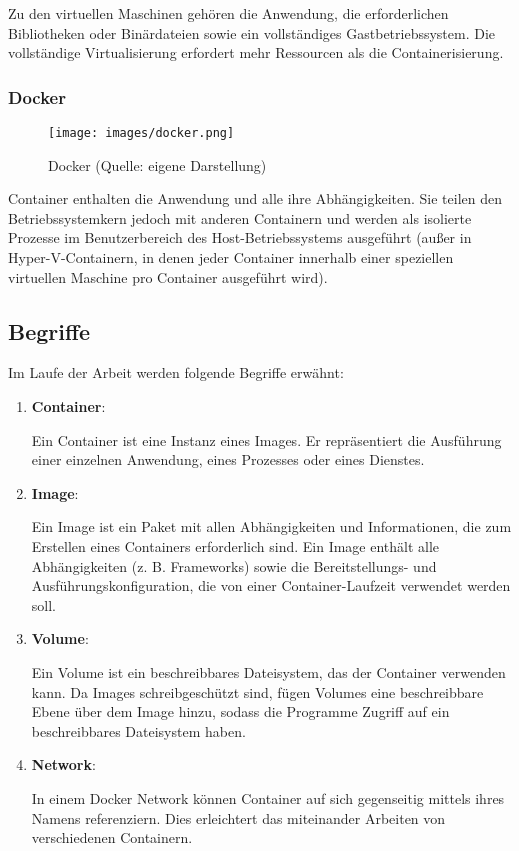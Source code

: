 Zu den virtuellen Maschinen gehören die Anwendung, die erforderlichen Bibliotheken oder Binärdateien sowie ein vollständiges Gastbetriebssystem. Die vollständige Virtualisierung erfordert mehr Ressourcen als die Containerisierung. \cite{docker}

\subsubsection{Docker}

\begin{figure}[H]
    \begin{center}
        \texttt{[image: images/docker.png]}
        \caption{Docker (Quelle: eigene Darstellung)}
    \end{center}
\end{figure}

Container enthalten die Anwendung und alle ihre Abhängigkeiten. Sie teilen den Betriebssystemkern jedoch mit anderen Containern und werden als isolierte Prozesse im Benutzerbereich des Host-Betriebssystems ausgeführt (außer in Hyper-V-Containern, in denen jeder Container innerhalb einer speziellen virtuellen Maschine pro Container ausgeführt wird). \cite{docker}

\subsection{Begriffe}\label{docker-terminology}

Im Laufe der Arbeit werden folgende Begriffe erwähnt:

\begin{enumerate}
    \item \textbf{Container}:
    
    Ein Container ist eine Instanz eines Images. Er repräsentiert die Ausführung einer einzelnen Anwendung, eines Prozesses oder eines Dienstes. 

    \item \textbf{Image}:
    
    Ein Image ist ein Paket mit allen Abhängigkeiten und Informationen, die zum Erstellen eines Containers erforderlich sind. Ein Image enthält alle Abhängigkeiten (z. B. Frameworks) sowie die Bereitstellungs- und Ausführungskonfiguration, die von einer Container-Laufzeit verwendet werden soll. 

    \item \textbf{Volume}:
    
    Ein Volume ist ein beschreibbares Dateisystem, das der Container verwenden kann. Da Images schreibgeschützt sind, fügen Volumes eine beschreibbare Ebene über dem Image hinzu, sodass die Programme Zugriff auf ein beschreibbares Dateisystem haben. 

    \item \textbf{Network}:

    In einem Docker Network können Container auf sich gegenseitig mittels ihres Namens referenziern. Dies erleichtert das miteinander Arbeiten von verschiedenen Containern.
\end{enumerate}

